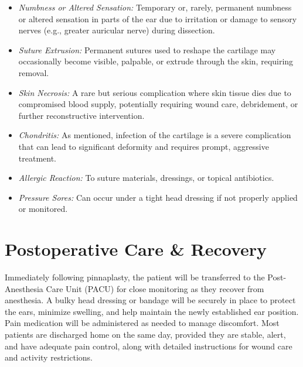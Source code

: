 \begin{itemize}
\begin{itemize}
      \item \textit{Numbness or Altered Sensation:} Temporary or, rarely, permanent numbness or altered sensation in parts of the ear due to irritation or damage to sensory nerves (e.g., greater auricular nerve) during dissection.
      \item \textit{Suture Extrusion:} Permanent sutures used to reshape the cartilage may occasionally become visible, palpable, or extrude through the skin, requiring removal.
      \item \textit{Skin Necrosis:} A rare but serious complication where skin tissue dies due to compromised blood supply, potentially requiring wound care, debridement, or further reconstructive intervention.
      \item \textit{Chondritis:} As mentioned, infection of the cartilage is a severe complication that can lead to significant deformity and requires prompt, aggressive treatment.
      \item \textit{Allergic Reaction:} To suture materials, dressings, or topical antibiotics.
      \item \textit{Pressure Sores:} Can occur under a tight head dressing if not properly applied or monitored.
    \end{itemize}
\end{itemize}

\section*{Postoperative Care \& Recovery}
Immediately following pinnaplasty, the patient will be transferred to the Post-Anesthesia Care Unit (PACU) for close monitoring as they recover from anesthesia. A bulky head dressing or bandage will be securely in place to protect the ears, minimize swelling, and help maintain the newly established ear position. Pain medication will be administered as needed to manage discomfort. Most patients are discharged home on the same day, provided they are stable, alert, and have adequate pain control, along with detailed instructions for wound care and activity restrictions.

